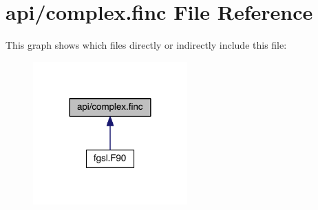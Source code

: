 \hypertarget{complex_8finc}{\section{api/complex.finc File Reference}
\label{complex_8finc}
}
This graph shows which files directly or indirectly include this file\-:
\nopagebreak
\begin{figure}[H]
\begin{center}
\leavevmode
\includegraphics[width=168pt]{complex_8finc__dep__incl}
\end{center}
\end{figure}
